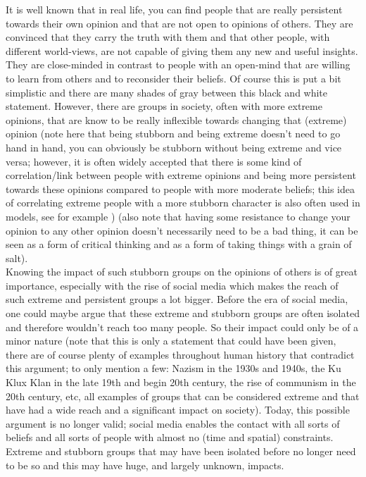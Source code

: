 \documentclass[11 pt , letterpaper , twoside , openright]{book}
\begin{document}
It is well known that in real life, you can find people that are really persistent towards their own opinion and that are not open to opinions of others. They are convinced that they carry the truth with them and that other people, with different world-views, are not capable of giving them any new and useful insights. They are close-minded in contrast to people with an open-mind that are willing to learn from others and to reconsider their beliefs. Of course this is put a bit simplistic and there are many shades of gray between this black and white statement. However, there are groups in society, often with more extreme opinions, that are know to be really inflexible towards changing that (extreme) opinion (note here that being stubborn and being extreme doesn't need to go hand in hand, you can obviously be stubborn without being extreme and vice versa; however, it is often widely accepted that there is some kind of correlation/link between people with extreme opinions and being more persistent towards these opinions compared to people with more moderate beliefs; this idea of correlating extreme people with a more stubborn character is also often used in models, see for example \cite{Deffuant2006}\cite{Turner}) (also note that having some resistance to change your opinion to any other opinion doesn't necessarily need to be a bad thing, it can be seen as a form of critical thinking and as a form of taking things with a grain of salt).\\ 
\newline
Knowing the impact of such stubborn groups on the opinions of others is of great importance, especially with the rise of social media which makes the reach of such extreme and persistent groups a lot bigger. Before the era of social media, one could maybe argue that these extreme and stubborn groups are often isolated and therefore wouldn't reach too many people. So their impact could only be of a minor nature (note that this is only a statement that could have been given, there are of course plenty of examples throughout human history that contradict this argument; to only mention a few: Nazism in the 1930s and 1940s, the Ku Klux Klan in the late 19th and begin 20th century, the rise of communism in the 20th century, etc, all examples of groups that can be considered extreme and that have had a wide reach and a significant impact on society). Today, this possible argument is no longer valid; social media enables the contact with all sorts of beliefs and all sorts of people with almost no (time and spatial) constraints. Extreme and stubborn groups that may have been isolated before no longer need to be so and this may have huge, and largely unknown, impacts. \\
\end{document}
